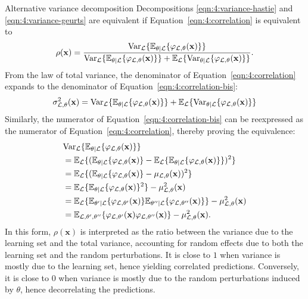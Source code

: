 \begin{remark}{Alternative variance decomposition}
Decompositions \ref{eqn:4:variance-hastie} and \ref{eqn:4:variance-geurts} are equivalent if Equation~\ref{eqn:4:correlation}
is equivalent to
\begin{equation}\label{eqn:4:correlation-bis}
\rho(\mathbf{x}) = \frac{\text{Var}_{\cal L} \{ \mathbb{E}_{\theta|{\cal L}} \{ \varphi_{{\cal L},\theta}(\mathbf{x}) \} \}}{\text{Var}_{\cal L} \{ \mathbb{E}_{\theta|{\cal L}} \{ \varphi_{{\cal L},\theta}(\mathbf{x}) \} \} + \mathbb{E}_{\cal L} \{ \text{Var}_{\theta|{\cal L}} \{ \varphi_{{\cal L},\theta}(\mathbf{x}) \} \}}.
\end{equation}
From the law of total variance, the denominator of Equation~\ref{eqn:4:correlation} expands
to the denominator of Equation~\ref{eqn:4:correlation-bis}:
\begin{equation}
\sigma^2_{{\cal L},\theta}(\mathbf{x}) = \text{Var}_{\cal L} \{ \mathbb{E}_{\theta|{\cal L}} \{ \varphi_{{\cal L},\theta}(\mathbf{x}) \} \} + \mathbb{E}_{\cal L} \{ \text{Var}_{\theta|{\cal L}} \{ \varphi_{{\cal L},\theta}(\mathbf{x}) \} \}
\end{equation}
Similarly, the numerator of Equation~\ref{eqn:4:correlation-bis} can be reexpressed
as the numerator of Equation~\ref{eqn:4:correlation}, thereby proving the equivalence:
\begin{align}
& \text{Var}_{\cal L} \{ \mathbb{E}_{\theta|{\cal L}} \{ \varphi_{{\cal L},\theta}(\mathbf{x}) \} \} \nonumber \\
&= \mathbb{E}_{\cal L} \{ (\mathbb{E}_{\theta|{\cal L}} \{ \varphi_{{\cal L},\theta}(\mathbf{x}) \} - \mathbb{E}_{\cal L} \{ \mathbb{E}_{\theta|{\cal L}} \{ \varphi_{{\cal L},\theta}(\mathbf{x})\} \})^2 \} \nonumber \\
&= \mathbb{E}_{\cal L} \{ (\mathbb{E}_{\theta|{\cal L}} \{ \varphi_{{\cal L},\theta}(\mathbf{x}) \} - \mu_{{\cal L},\theta}(\mathbf{x}))^2 \} \nonumber \\
&= \mathbb{E}_{\cal L} \{ \mathbb{E}_{\theta|{\cal L}} \{ \varphi_{{\cal L},\theta}(\mathbf{x}) \}^2 \} - \mu^2_{{\cal L},\theta}(\mathbf{x}) \nonumber \\
&= \mathbb{E}_{\cal L} \{ \mathbb{E}_{\theta^\prime|{\cal L}} \{ \varphi_{{\cal L},\theta^\prime}(\mathbf{x}) \} \mathbb{E}_{\theta^{\prime\prime}|{\cal L}} \{ \varphi_{{\cal L},\theta^{\prime\prime}}(\mathbf{x}) \} \} - \mu^2_{{\cal L},\theta}(\mathbf{x}) \nonumber \\
&= \mathbb{E}_{{\cal L},\theta^\prime,\theta^{\prime\prime}} \{ \varphi_{{\cal L},\theta^\prime}(\mathbf{x}) \varphi_{{\cal L},\theta^{\prime\prime}}(\mathbf{x}) \} - \mu^2_{{\cal L},\theta}(\mathbf{x}).
\end{align}
In this form, $\rho(\mathbf{x})$ is interpreted as the ratio between the variance
due to the learning set  and the total variance, accounting for
random effects due to both the learning set and the random perturbations.
It is close to $1$ when variance is mostly due to the learning set, hence
yielding correlated predictions. Conversely, it is close to $0$ when variance
is mostly due to the random perturbations induced by $\theta$, hence decorrelating
the predictions.
\end{remark}

